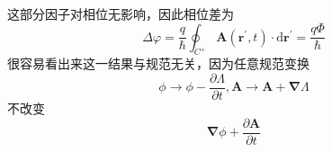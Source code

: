 \documentclass[12pt, a4paper, oneside]{ctexart}
\begin{document}
	\quad\quad 这部分因子对相位无影响，因此相位差为
	\begin{equation}
		\Delta\varphi=\dfrac{q}{\hbar}\oint_{C^{+}}\boldsymbol{A}(\boldsymbol{r^{'}},t)\cdot\mathrm{d}\boldsymbol{r^{'}}=\dfrac{q\Phi}{\hbar}
	\end{equation}
	\quad\quad 很容易看出来这一结果与规范无关，因为任意规范变换
	\begin{equation}
		\phi\to\phi-\dfrac{\partial\Lambda}{\partial t},\boldsymbol{A}\to\boldsymbol{A}+\boldsymbol{\nabla}\Lambda
	\end{equation}
	\quad\quad 不改变
	\begin{equation}
		\boldsymbol{\nabla}\phi+\dfrac{\partial\boldsymbol{A}}{\partial t}
	\end{equation}
\end{document}
